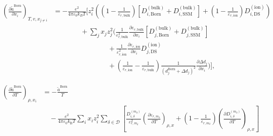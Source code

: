 \documentclass[12pt, letterpaper]{article}
\begin{document}
\begin{equation}
    \begin{aligned}
        \left(\frac{\partial \tilde{a}^{\mathrm{Born}}}{\partial x_{i}}\right)_{T,v,x_{j\neq i}}
         & =
        -\frac{e^2}{4\pi\varepsilon_{0} k_{B} T}
        \Bigg[
            z_{i}^2\!\left(
            \left(1-\frac{1}{\varepsilon_{r,\mathrm{bulk}}}\right)
            \left[D_{i,\mathrm{Born}}^{(\mathrm{bulk})}+D_{i,\mathrm{SSM}}^{(\mathrm{bulk})}\right]
            +
            \left(1-\frac{1}{\varepsilon_{r,\mathrm{ion}}}\right)D_{i,\mathrm{DS}}^{(\mathrm{ion})}
            \right)
        \\
         & \qquad\qquad
            +\sum_{j} x_{j} z_{j}^2
            \Bigg(
            \frac{1}{\varepsilon_{r,\mathrm{bulk}}^2}
            \frac{\partial \varepsilon_{r,\mathrm{bulk}}}{\partial x_{i}}
            \left[D_{j,\mathrm{Born}}^{(\mathrm{bulk})}+D_{j,\mathrm{SSM}}^{(\mathrm{bulk})}\right]
            \\
         & \qquad\qquad\qquad\qquad
            +
            \frac{1}{\varepsilon_{r,\mathrm{ion}}^2}
            \frac{\partial \varepsilon_{r,\mathrm{ion}}}{\partial x_{i}}
            D_{j,\mathrm{DS}}^{(\mathrm{ion})}
            \\
         & \qquad\qquad\qquad\qquad
            +
            \left(\frac{1}{\varepsilon_{r,\mathrm{ion}}}-\frac{1}{\varepsilon_{r,\mathrm{bulk}}}\right)
            \frac{1}{\left(d_{j}^{\mathrm{Born}}+\Delta d_{j}\right)^2}
            \frac{\partial \Delta d_{j}}{\partial x_{i}}
            \Bigg)
            \Bigg],
    \end{aligned}
    \label{eq:born_ares_ssmds_dxi}
\end{equation}


\begin{equation}
    \begin{aligned}
        \left(\frac{\partial\tilde{a}^{\mathrm{Born}}}{\partial T}\right)_{\rho,x_i}
        &=
        -\frac{\tilde{a}^{\mathrm{Born}}}{T}
        \\
        &\quad -\frac{e^2}{4\pi\varepsilon_0 k_{\mathrm{B}} T}
        \sum_i x_i z_i^2
        \sum_{\delta \in \mathcal{D}}
        \left[
            \frac{D_{i,\delta}^{(m_\delta)}}{\varepsilon_{r,m_\delta}^{2}}
            \left(\frac{\partial \varepsilon_{r,m_\delta}}{\partial T}\right)_{\rho,x}
            +
            \left(1-\frac{1}{\varepsilon_{r,m_\delta}}\right)
            \left(\frac{\partial D_{i,\delta}^{(m_\delta)}}{\partial T}\right)_{\rho,x}
        \right]
    \end{aligned}
    \label{eq:born_ares_dT}
\end{equation}
\end{document}

